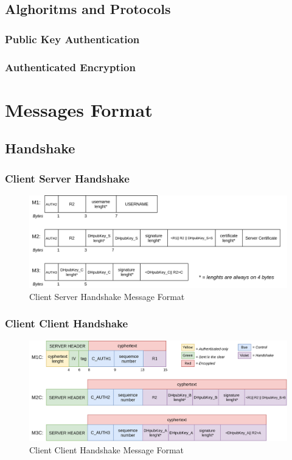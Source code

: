 \documentclass[11pt]{report}
\begin{document}
\section{Alghoritms and Protocols}
\subsection{Public Key Authentication}
\subsection{Authenticated Encryption}
\chapter{Messages Format}

\section{Handshake}
\subsection*{Client Server Handshake}
\begin{figure}[H]
	\centering
	\includegraphics[scale=0.19]{img/AuthClientServer_messageFormat.png}
	\caption{Client Server Handshake Message Format}
	\label {img: FormatClientServer}
\end{figure}
\subsection*{Client Client Handshake}
\begin{figure}[H]
	\centering
	\includegraphics[scale=0.22]{img/AuthClientClient_messageFormat.png}
	\caption{Client Client Handshake Message Format}
	\label {img: FormatClientClient}
\end{figure}
\newpage
\end{document}
